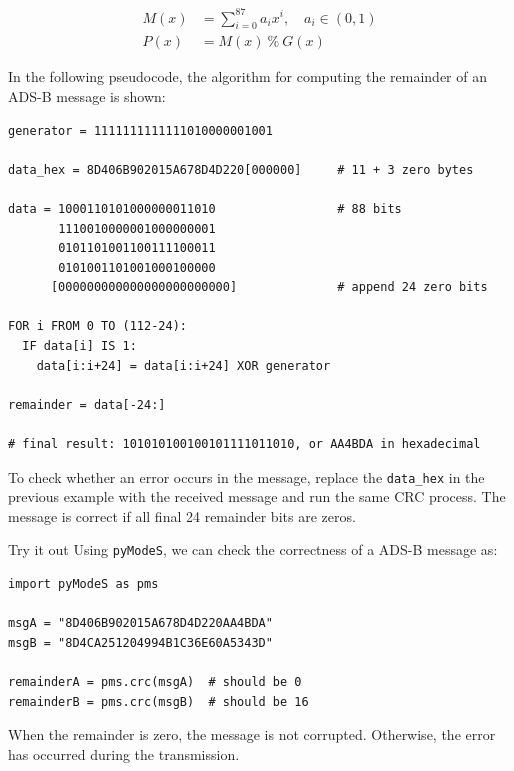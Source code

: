 \begin{equation}
  \begin{split}
    M(x) &= \sum_{i=0}^{87} a_i x^i , \quad a_i \in (0, 1)\\
    P(x) &= M(x) ~ \% ~ G(x)
  \end{split}
\end{equation}

In the following pseudocode, the algorithm for computing the remainder of an ADS-B message is shown:

\begin{verbatim}
generator = 1111111111111010000001001

data_hex = 8D406B902015A678D4D220[000000]     # 11 + 3 zero bytes

data = 1000110101000000011010                 # 88 bits
       1110010000001000000001
       0101101001100111100011
       0101001101001000100000
      [000000000000000000000000]              # append 24 zero bits

FOR i FROM 0 TO (112-24):
  IF data[i] IS 1:
    data[i:i+24] = data[i:i+24] XOR generator

remainder = data[-24:]

# final result: 101010100100101111011010, or AA4BDA in hexadecimal
\end{verbatim}

To check whether an error occurs in the message, replace the \texttt{data\_hex} in the previous example with the received message and run the same CRC process. The message is correct if all final 24 remainder bits are zeros.

\begin{notebox}{Try it out}
Using \texttt{pyModeS}, we can check the correctness of a ADS-B message as: 

\begin{verbatim}
import pyModeS as pms

msgA = "8D406B902015A678D4D220AA4BDA"
msgB = "8D4CA251204994B1C36E60A5343D"

remainderA = pms.crc(msgA)  # should be 0
remainderB = pms.crc(msgB)  # should be 16
\end{verbatim}

When the remainder is zero, the message is not corrupted. Otherwise, the error has occurred during the transmission.
\end{notebox}